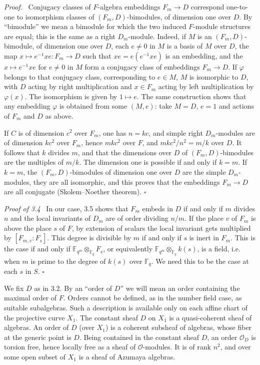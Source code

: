 \documentclass[10pt]{article}
\newcommand{\Fq}{\mathbb F_q}
\newcommand{\OD}{\mathcal O_D}
\newcommand{\OO}{\mathcal O}
\theoremstyle{deligne}
\newenvironment{proofdel}[1][Proof.]{\textit{#1}\ }{\hfill$\square$}
\newcommand{\heading}[1]{\vspace{0.7em}\noindent{\bfseries #1}\quad}
\begin{document}
\begin{proofdel}
Conjugacy classes of $F$-algebra embeddings $F_m\to D$ correspond one-to-one to isomorphism classes of $(F_m,D)$-bimodules, of dimension one over $D$. By ``bimodule'' we mean a bimodule for which the two induced $F$-module structures are equal; this is the same as a right $D_m$-module. Indeed, if $M$ is an $(F_m,D)$-bimodule, of dimension one over $D$, each $e\ne0$ in $M$ is a basis of $M$ over $D$, the map $x\mapsto e^{-1}xe:F_m\to D$ such that $xe=e(e^{-1}xe)$ is an embedding, and the $x\mapsto e^{-1}xe$ for $e\ne0$ in $M$ form a conjugacy class of embeddings $F_m\to D$. If $\varphi$ belongs to that conjugacy class, corresponding to $e\in M$, $M$ is isomorphic to $D$, with $D$ acting by right multiplication and $x\in F_m$ acting by left multiplication by $\varphi(x)$. The isomorphism is given by $1\mapsto e$. The same construction shows that any embedding $\varphi$ is obtained from some $(M,e)$: take $M=D$, $e=1$ and actions of $F_m$ and $D$ as above.

If $C$ is of dimension $c^2$ over $F_m$, one has $n=kc$, and simple right $D_m$-modules are of dimension $kc^2$ over $F_m$, hence $mkc^2$ over $F$, and $mkc^2/n^2=m/k$ over $D$. It follows that $k$ divides $m$, and that the dimensions over $D$ of $(F_m,D)$-bimodules are the multiples of $m/k$. The dimension one is possible if and only if $k=m$. If $k=m$, the $(F_m,D)$-bimodules of dimension one over $D$ are the simple $D_m$-modules, they are all isomorphic, and this proves that the embeddings $F_m\to D$ are all conjugate (Skolem--Noether theorem).
\end{proofdel}

\begin{proofdel}[Proof of 3.4]
In our case, 3.5 shows that $F_m$ embeds in $D$ if and only if $m$ divides $n$ and the local invariants of $D_m$ are of order dividing $n/m$. If the place $v$ of $F_m$ is above the place $s$ of $F$, by extension of scalars the local invariant gets multiplied by $[F_{m,v}:F_s]$. This degree is divisible by $m$ if and only if $s$ is inert in $F_m$. This is the case if and only if $\mathbb F_{q^m}\otimes_{\Fq}F_s$, or equivalently $\mathbb F_{q^m}\otimes_{\Fq}k(s)$, is a field, i.e. when $m$ is prime to the degree of $k(s)$ over $\Fq$. We need this to be the case at each $s$ in $S$.
\end{proofdel}

\heading{3.6.} We fix $D$ as in 3.2. By an ``order of $D$'' we will mean an order containing the maximal order of $F$. Orders cannot be defined, as in the number field case, as suitable subalgebras. Such a description is available only on each affine chart of the projective curve $X_1$. The constant sheaf $D$ on $X_1$ is a quasi-coherent sheaf of algebras. An order of $D$ (over $X_1$) is a coherent subsheaf of algebras, whose fiber at the generic point is $D$. Being contained in the constant sheaf $D$, an order $\OD$ is torsion free, hence locally free as a sheaf of $\OO$-modules. It is of rank $n^2$, and over some open subset of $X_1$ is a sheaf of Azumaya algebras.
\end{document}

